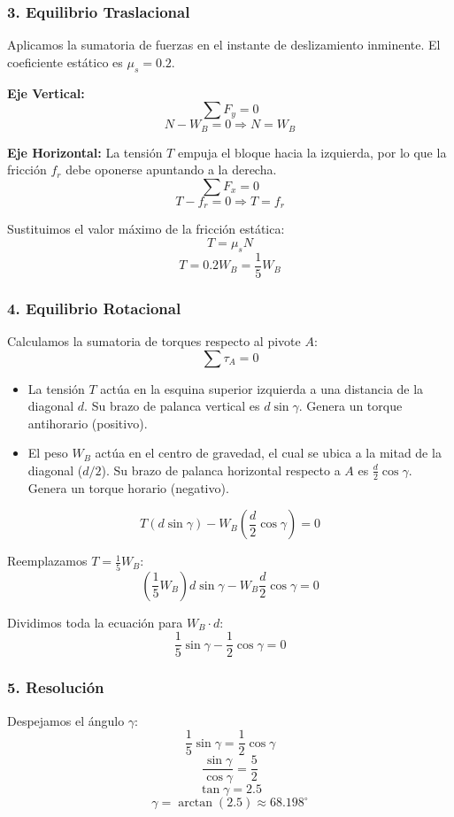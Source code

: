 \documentclass[12pt, a4paper]{article}
\begin{document}
\subsubsection*{3. Equilibrio Traslacional}
Aplicamos la sumatoria de fuerzas en el instante de deslizamiento inminente. El coeficiente estático es $\mu_s = 0.2$.

\textbf{Eje Vertical:}
$$\sum F_y = 0$$
$$N - W_B = 0 \Rightarrow N = W_B$$

\textbf{Eje Horizontal:}
La tensión $T$ empuja el bloque hacia la izquierda, por lo que la fricción $f_r$ debe oponerse apuntando a la derecha.
$$\sum F_x = 0$$
$$T - f_r = 0 \Rightarrow T = f_r$$

Sustituimos el valor máximo de la fricción estática:
$$T = \mu_s N$$
$$T = 0.2 W_B = \frac{1}{5} W_B$$

\subsubsection*{4. Equilibrio Rotacional}
Calculamos la sumatoria de torques respecto al pivote $A$:
$$\sum \tau_A = 0$$

\begin{itemize}
    \item La tensión $T$ actúa en la esquina superior izquierda a una distancia de la diagonal $d$. Su brazo de palanca vertical es $d \sin \gamma$. Genera un torque antihorario (positivo).
    \item El peso $W_B$ actúa en el centro de gravedad, el cual se ubica a la mitad de la diagonal ($d/2$). Su brazo de palanca horizontal respecto a $A$ es $\frac{d}{2} \cos \gamma$. Genera un torque horario (negativo).
\end{itemize}

$$T (d \sin \gamma) - W_B \left( \frac{d}{2} \cos \gamma \right) = 0$$

Reemplazamos $T = \frac{1}{5} W_B$:
$$\left( \frac{1}{5} W_B \right) d \sin \gamma - W_B \frac{d}{2} \cos \gamma = 0$$

Dividimos toda la ecuación para $W_B \cdot d$:
$$\frac{1}{5} \sin \gamma - \frac{1}{2} \cos \gamma = 0$$

\subsubsection*{5. Resolución}
Despejamos el ángulo $\gamma$:
$$\frac{1}{5} \sin \gamma = \frac{1}{2} \cos \gamma$$
$$\frac{\sin \gamma}{\cos \gamma} = \frac{5}{2}$$
$$\tan \gamma = 2.5$$
$$\gamma = \arctan(2.5) \approx 68.198^\circ$$
\end{document}
